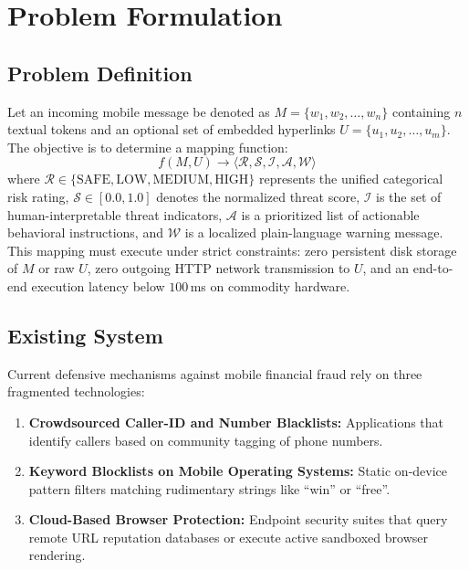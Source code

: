 \documentclass[conference]{IEEEtran}
\begin{document}
\section{Problem Formulation}

\subsection{Problem Definition}
Let an incoming mobile message be denoted as $M = \{w_1, w_2, \dots, w_n\}$ containing $n$ textual tokens and an optional set of embedded hyperlinks $U = \{u_1, u_2, \dots, u_m\}$. The objective is to determine a mapping function:
\begin{equation}
f(M, U) \to \langle \mathcal{R}, \mathcal{S}, \mathcal{I}, \mathcal{A}, \mathcal{W} \rangle
\end{equation}
where $\mathcal{R} \in \{\text{SAFE}, \text{LOW}, \text{MEDIUM}, \text{HIGH}\}$ represents the unified categorical risk rating, $\mathcal{S} \in [0.0, 1.0]$ denotes the normalized threat score, $\mathcal{I}$ is the set of human-interpretable threat indicators, $\mathcal{A}$ is a prioritized list of actionable behavioral instructions, and $\mathcal{W}$ is a localized plain-language warning message. This mapping must execute under strict constraints: zero persistent disk storage of $M$ or raw $U$, zero outgoing HTTP network transmission to $U$, and an end-to-end execution latency below $100$\,ms on commodity hardware.

\subsection{Existing System}
Current defensive mechanisms against mobile financial fraud rely on three fragmented technologies:
\begin{enumerate}
    \item \textbf{Crowdsourced Caller-ID and Number Blacklists:} Applications that identify callers based on community tagging of phone numbers.
    \item \textbf{Keyword Blocklists on Mobile Operating Systems:} Static on-device pattern filters matching rudimentary strings like ``win'' or ``free''.
    \item \textbf{Cloud-Based Browser Protection:} Endpoint security suites that query remote URL reputation databases or execute active sandboxed browser rendering.
\end{enumerate}
\end{document}
